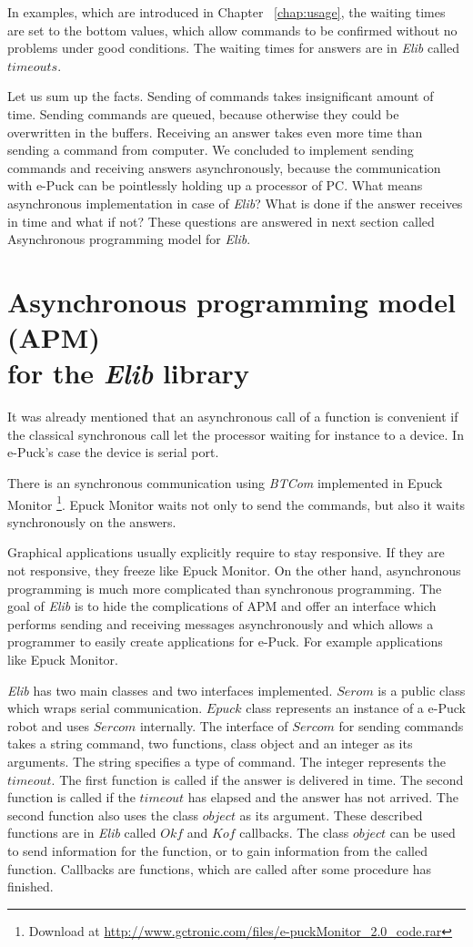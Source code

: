 	In examples, which are introduced in Chapter ~\ref{chap:usage}, the waiting times are set to the bottom values,
	which allow commands to be confirmed without no problems under good conditions.
	The waiting times for answers are in {\it Elib} called $timeouts$.
	 
	Let us sum up the facts. Sending of commands takes insignificant amount of time.
	Sending commands are queued, because otherwise they could be overwritten in the buffers.
	Receiving an answer takes even more time than sending a command from computer.
	We concluded to implement sending commands and receiving answers asynchronously, because the communication with e-Puck
	can be pointlessly holding up a processor of PC.
	What means asynchronous implementation in case of {\it Elib}? What is done if the answer receives in time
	and what if not? These questions are answered in next section called Asynchronous programming model for {\it Elib}.
\section{Asynchronous programming model (APM)\\ for the {\it Elib} library}
	\label{sec:apm}
	It was already mentioned that an asynchronous call of a function is convenient if the
	classical synchronous call let the processor waiting for instance to a device.
	In e-Puck's case the device is serial port. 
	 
	There is an synchronous communication using {\it BTCom} implemented in Epuck Monitor
	\footnote{\small{Download at \url{http://www.gctronic.com/files/e-puckMonitor_2.0_code.rar}}}. 
	Epuck Monitor waits not only to send the commands, but also it waits synchronously on the answers.
	 
	Graphical applications usually explicitly require to stay responsive. 
	If they are not responsive, they freeze like Epuck Monitor.
	On the other hand, asynchronous programming is much more complicated than synchronous programming.
	The goal of {\it Elib} is to hide the complications of APM and offer an interface
	which performs sending and receiving messages asynchronously and
	which allows a programmer to easily create applications for e-Puck. For example applications like Epuck Monitor.
	 
	{\it Elib} has two main classes and two interfaces implemented.
	$Serom$ is a public class which wraps serial communication.
	$Epuck$ class represents an instance of a e-Puck robot and uses $Sercom$ internally.
	The interface of $Sercom$ for sending commands takes a
	string command, two functions, class object and an integer as its arguments.
	The string specifies a type of command. The integer represents the $timeout$.
	The first function is called if the answer is delivered in time.
	The second function is called if the $timeout$ has elapsed and the answer has not arrived.
	The second function also uses the class $object$ as its argument.  These described
	functions are in {\it Elib} called $Okf$ and $Kof$ callbacks. The class $object$
	can be used to send information for the function, or to gain information from the called function.
	Callbacks are functions, which are called after some procedure has finished.

